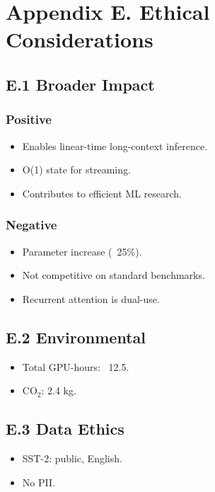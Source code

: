 \section{Appendix E. Ethical Considerations}

\subsection{E.1 Broader Impact}

\subsubsection{Positive}
\begin{itemize}
\item Enables linear-time long-context inference.
\item O(1) state for streaming.
\item Contributes to efficient ML research.

\end{itemize}
\subsubsection{Negative}
\begin{itemize}
\item Parameter increase (~25\%).
\item Not competitive on standard benchmarks.
\item Recurrent attention is dual-use.

\end{itemize}
\subsection{E.2 Environmental}

\begin{itemize}
\item Total GPU-hours: ~12.5.
\item CO$_2$: 2.4 kg.

\end{itemize}
\subsection{E.3 Data Ethics}

\begin{itemize}
\item SST-2: public, English.
\item No PII.

\end{itemize}
